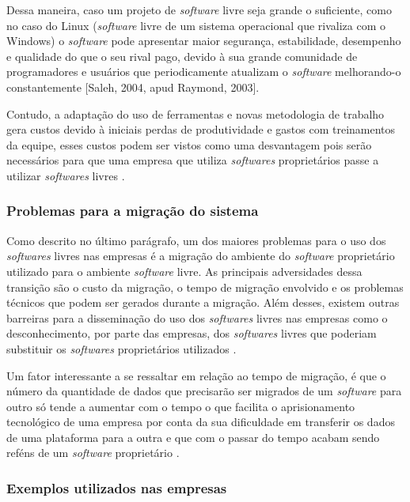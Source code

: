 \documentclass[12pt]{article}
\begin{document}
Dessa maneira, caso um projeto de \textit{software} livre seja grande o suficiente, como no caso do Linux (\textit{software} livre de um sistema operacional que rivaliza com o Windows) o \textit{software} pode apresentar maior segurança, estabilidade, desempenho e qualidade do que o seu rival pago, devido à sua grande comunidade de programadores e usuários que periodicamente atualizam o \textit{software} melhorando-o constantemente [Saleh, 2004, apud Raymond, 2003].


Contudo, a adaptação do uso de ferramentas e novas metodologia de trabalho gera custos devido à iniciais perdas de produtividade e gastos com treinamentos da equipe, esses custos podem ser vistos como uma desvantagem pois serão necessários para que uma empresa que utiliza \textit{softwares} proprietários passe a utilizar \textit{softwares} livres \cite{cerqueira2011}.

\subsubsection {Problemas para a migração do sistema}

Como descrito no último parágrafo, um dos maiores problemas para o uso dos \textit{softwares} livres nas empresas é a migração do ambiente do \textit{software} proprietário utilizado para o ambiente \textit{software} livre. As principais adversidades dessa transição são o custo da migração, o tempo de migração envolvido e os problemas técnicos que podem ser gerados durante a migração. Além desses, existem outras barreiras para a disseminação do uso dos \textit{softwares} livres nas empresas como o desconhecimento, por parte das empresas, dos \textit{softwares} livres que poderiam substituir os \textit{softwares} proprietários utilizados \cite{saleh2004}.

Um fator interessante a se ressaltar em relação ao tempo de migração, é que o número da quantidade de dados que precisarão ser migrados de um \textit{software} para outro só tende a aumentar com o tempo o que facilita o aprisionamento tecnológico de uma empresa por conta da sua dificuldade em transferir os dados de uma plataforma para a outra e que com o passar do tempo acabam sendo reféns de um \textit{software} proprietário \cite{bilich2002}.


\subsubsection {Exemplos utilizados nas empresas}
\end{document}
